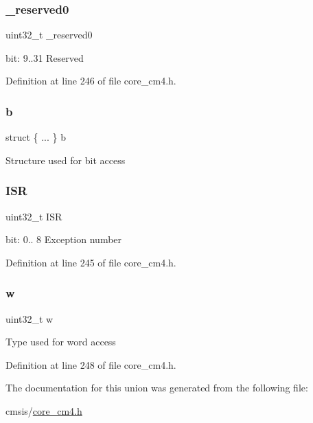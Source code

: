 \subsubsection{\texorpdfstring{\+\_\+reserved0}{\_reserved0}}
{\footnotesize\ttfamily uint32\+\_\+t \+\_\+reserved0}

bit\+: 9..31 Reserved 

Definition at line 246 of file core\+\_\+cm4.\+h.

\mbox{\label{union_i_p_s_r___type_a3758147356a15906221a5625a27d9048}} 
\subsubsection{\texorpdfstring{b}{b}}
{\footnotesize\ttfamily struct \{ ... \}   b}

Structure used for bit access \mbox{\label{union_i_p_s_r___type_ad502ba7dbb2aab5f87c782b28f02622d}} 
\subsubsection{\texorpdfstring{I\+SR}{ISR}}
{\footnotesize\ttfamily uint32\+\_\+t I\+SR}

bit\+: 0.. 8 Exception number 

Definition at line 245 of file core\+\_\+cm4.\+h.

\mbox{\label{union_i_p_s_r___type_ad0fb62e7a08e70fc5e0a76b67809f84b}} 
\subsubsection{\texorpdfstring{w}{w}}
{\footnotesize\ttfamily uint32\+\_\+t w}

Type used for word access 

Definition at line 248 of file core\+\_\+cm4.\+h.



The documentation for this union was generated from the following file\+:\begin{DoxyCompactItemize}
\item 
cmsis/\hyperlink{core__cm4_8h}{core\+\_\+cm4.\+h}\end{DoxyCompactItemize}
